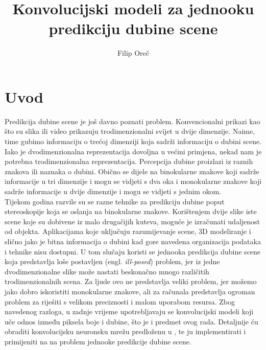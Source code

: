 \documentclass[times, utf8, zavrsni, numeric]{fer}
\begin{document}

\title{Konvolucijski modeli za jednooku predikciju dubine scene}

\author{Filip Oreč}

\maketitle

\izvornik


\tableofcontents

\chapter{Uvod}
Predikcija dubine scene je još davno poznati problem. Konvencionalni
prikazi kao što su slika ili video prikazuju trodimenzionalni svijet u
dvije dimenzije. Naime, time gubimo informaciju o trećoj dimenziji koja
sadrži informaciju o dubini scene. Iako je dvodimenzionalna 
reprezentacija dovoljna u većini primjena, nekad nam je potrebna
trodimenzionalna reprezentacija. Percepcija dubine proizlazi iz
raznih znakova ili naznaka o dubini. Obično se dijele na binokularne 
znakove koji sadrže informacije u tri dimenzije i mogu se vidjeti s dva 
oka i monokularne znakove koji sadrže informacije u dvije dimenzije i 
mogu se vidjeti s jednim okom.\\\indent 
Tijekom godina razvile su se razne tehnike za predikciju dubine poput
stereoskopije koja se oslanja na binokularne znakove. Korištenjem dvije slike 
iste scene koje su dobivene iz malo drugačijih kuteva, moguće je izračunati 
udaljenost od objekta. Aplikacijama koje uključuju 
razumijevanje scene, 3D modeliranje i slično jako je bitna informacija o 
dubini kad gore navedena organizacija podataka i tehnike nisu dostupni.
U tom slučaju koristi se jednooka predikcija dubine scene koja predstavlja 
loše postavljen (engl. \textit{ill-posed}) problem, jer iz jedne dvodimenzionalne slike 
može nastati beskonačno mnogo različitih trodimenzionalnih scena. Za ljude 
ovo ne predstavlja veliki problem, jer možemo jako dobro iskoristiti 
monokularne znakove, ali za računala predstavlja ogroman problem za riješiti 
s velikom preciznosti i malom uporabom resursa.
Zbog navedenog razloga, u zadnje vrijeme upotrebljavaju se konvolucijski
modeli koji uče odnos između piksela boje i dubine, što je i predmet ovog
rada. Detaljnije ću obraditi konvolucijsku neuronsku mrežu predloženu u 
\cite{DBLP:journals/corr/LainaRBTN16}, te ju implementirati i primijeniti na
na problem jednooke predikcije dubine scene.\\\indent
\end{document}
